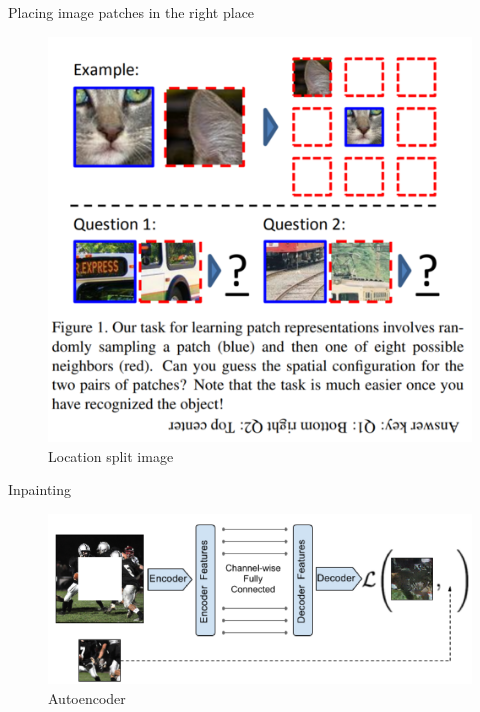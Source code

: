 \documentclass{beamer}
\begin{document}
	\begin{frame}{Placing image patches in the right place}\vspace{4pt}
		\begin{figure}
			\centering
			\includegraphics[scale=1]{placing.png}
			\caption{Location split image}
		\end{figure}
	\end{frame}
	
	\begin{frame}{Inpainting}\vspace{4pt}
		\begin{figure}
			\centering
			\includegraphics[scale=1]{inpainting.png}
			\caption{Autoencoder}
		\end{figure}
	\end{frame}
	
\end{document}
